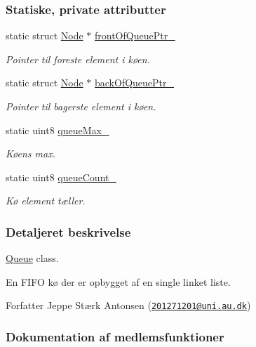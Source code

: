\subsubsection*{Statiske, private attributter}
\begin{DoxyCompactItemize}
\item 
static struct \hyperlink{queue_8c_db/d8b/struct_node}{Node} $\ast$ \hyperlink{class_queue_aa48f05218d0a78402821c8aa9bdad06a}{front\+Of\+Queue\+Ptr\+\_\+}
\begin{DoxyCompactList}\small\item\em Pointer til foreste element i køen. \end{DoxyCompactList}\item 
static struct \hyperlink{queue_8c_db/d8b/struct_node}{Node} $\ast$ \hyperlink{class_queue_a225d2c9ad4e83d6da443e99b8869a51c}{back\+Of\+Queue\+Ptr\+\_\+}
\begin{DoxyCompactList}\small\item\em Pointer til bagerste element i køen. \end{DoxyCompactList}\item 
static uint8 \hyperlink{class_queue_acb6b6e88c9e4d12839594b31e6ff7c5a}{queue\+Max\+\_\+}
\begin{DoxyCompactList}\small\item\em Køens max. \end{DoxyCompactList}\item 
static uint8 \hyperlink{class_queue_ad260f9ccca00e80d161bbf3e70c3ffa6}{queue\+Count\+\_\+}
\begin{DoxyCompactList}\small\item\em Kø element tæller. \end{DoxyCompactList}\end{DoxyCompactItemize}


\subsubsection{Detaljeret beskrivelse}
\hyperlink{class_queue}{Queue} class. 

En F\+I\+FO kø der er opbygget af en single linket liste. \begin{DoxyAuthor}{Forfatter}
Jeppe Stærk Antonsen (\href{mailto:201271201@uni.au.dk}{\tt 201271201@uni.\+au.\+dk}) 
\end{DoxyAuthor}


\subsubsection{Dokumentation af medlemsfunktioner}
